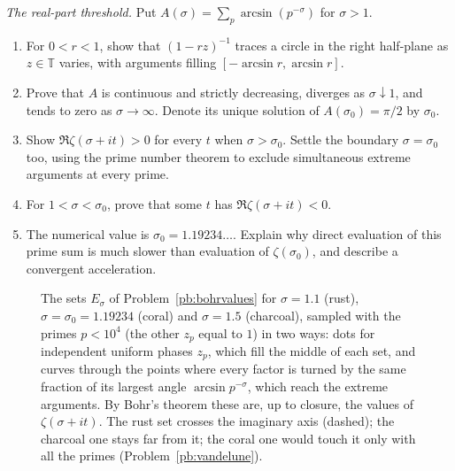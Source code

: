 \begin{exercise}[$\star\star\star$]\label{pb:vandelune}
\emph{The real-part threshold.} Put $A(\sigma)=\sum_p\arcsin(p^{-\sigma})$ for $\sigma>1$.
\begin{enumerate}[label=(\alph*)]
\item For $0<r<1$, show that $(1-rz)^{-1}$ traces a circle in the right half-plane as $z\in\mathbb T$ varies, with arguments filling $[-\arcsin r,\arcsin r]$.
\item Prove that $A$ is continuous and strictly decreasing, diverges as $\sigma\downarrow1$, and tends to zero as $\sigma\to\infty$. Denote its unique solution of $A(\sigma_0)=\pi/2$ by $\sigma_0$.
\item Show $\Re\zeta(\sigma+it)>0$ for every $t$ when $\sigma>\sigma_0$. Settle the boundary $\sigma=\sigma_0$ too, using the prime number theorem to exclude simultaneous extreme arguments at every prime.
\item For $1<\sigma<\sigma_0$, prove that some $t$ has $\Re\zeta(\sigma+it)<0$.
\item The numerical value is $\sigma_0=1.19234\ldots$. Explain why direct evaluation of this prime sum is much slower than evaluation of $\zeta(\sigma_0)$, and describe a convergent acceleration.
\end{enumerate}
\end{exercise}
\begin{figure}[ht]
\centering
{}
\caption{The sets $E_\sigma$ of Problem~\ref{pb:bohrvalues} for $\sigma=1.1$ (rust), $\sigma=\sigma_0=1.19234$ (coral) and $\sigma=1.5$ (charcoal), sampled with the primes
$p<10^4$ (the other $z_p$ equal to $1$) in two ways: dots for independent uniform phases $z_p$, which fill the middle of each set, and curves through the points where every
factor is turned by the same fraction of its largest angle $\arcsin p^{-\sigma}$, which reach the extreme arguments. By Bohr's theorem these are, up to closure, the values of $\zeta(\sigma+it)$. The rust set
crosses the imaginary axis (dashed); the charcoal one stays far from it; the coral one would touch it only with all the primes (Problem~\ref{pb:vandelune}).}\label{fig:zetavalues}
\end{figure}

